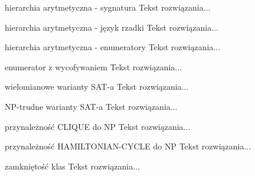 \begin{solution}{hierarchia arytmetyczna - sygnatura}
Tekst rozwiązania...
\end{solution}

\begin{solution}{hierarchia arytmetyczna - język rzadki}
Tekst rozwiązania...
\end{solution}

\begin{solution}{hierarchia arytmetyczna - enumeratory}
Tekst rozwiązania...
\end{solution}

\begin{solution}{enumerator z wycofywaniem}
Tekst rozwiązania...
\end{solution}

\begin{solution}{wielomianowe warianty SAT-a}
Tekst rozwiązania...
\end{solution}

\begin{solution}{NP-trudne warianty SAT-a}
Tekst rozwiązania...
\end{solution}

\begin{solution}{przynależność CLIQUE do NP}
Tekst rozwiązania...
\end{solution}

\begin{solution}{przynależność HAMILTONIAN-CYCLE do NP}
Tekst rozwiązania...
\end{solution}


\begin{solution}{zamkniętość klas}
Tekst rozwiązania...
\end{solution}

